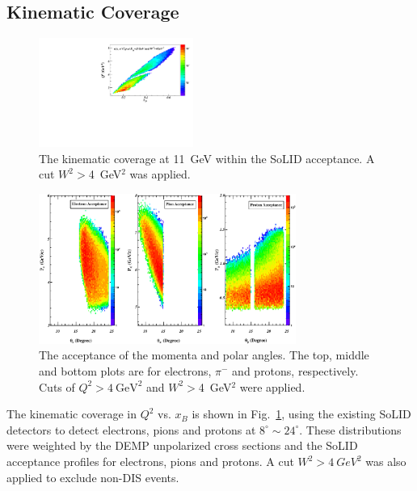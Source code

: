 \subsection{Kinematic Coverage}
\begin{figure}[!ht]
 \begin{center}
      \includegraphics[type=pdf,
        ext=.pdf,read=.pdf,width=0.45\textwidth]{./figures//Q2_x_02Hz}
  
   \caption{\footnotesize{The
kinematic coverage at 11~GeV within the SoLID acceptance. A cut $W^2>$4~GeV$^2$ was applied. }}
  \label{kin_cor}
  \end{center}
\end{figure}
\begin{figure}[!ht]
 \begin{center}
   \includegraphics[type=pdf,
     ext=.pdf,read=.pdf,width=0.75\textwidth]{./figures/dvmp_acceptance_narrow}
   \caption[The acceptance of the momenta and scattering angles for electrons,
    $\pi^{-}$ and protons]{\footnotesize{The acceptance of the momenta and
polar angles. The top, middle and bottom plots are for electrons, $\pi^{-}$ and
protons, respectively. Cuts of $Q^{2}>4~\mathrm{GeV^{2}}$ and $W^2>$4~GeV$^2$ were applied.}}
  \label{p_theta}
  \end{center}
\end{figure}
The kinematic coverage in $Q^{2}$ vs. $x_{B}$ is shown in Fig.~\ref{kin_cor},
using the existing SoLID detectors to detect electrons, pions and protons at
$8^{\circ}\sim24^{\circ}$. These distributions were
weighted by the DEMP unpolarized cross sections and the SoLID acceptance profiles for electrons, pions and protons. 
A cut $W^{2}>4~GeV^{2}$ was also applied to exclude non-DIS events.

